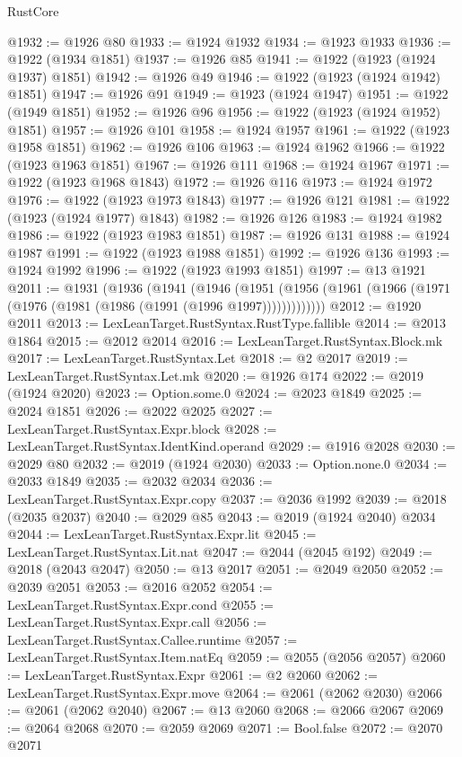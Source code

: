 \begin{lexlean}{RustCore}
\begin{coremodule}
@1932 := @1926 @80
@1933 := @1924 @1932
@1934 := @1923 @1933
@1936 := @1922 (@1934 @1851)
@1937 := @1926 @85
@1941 := @1922 (@1923 (@1924 @1937) @1851)
@1942 := @1926 @49
@1946 := @1922 (@1923 (@1924 @1942) @1851)
@1947 := @1926 @91
@1949 := @1923 (@1924 @1947)
@1951 := @1922 (@1949 @1851)
@1952 := @1926 @96
@1956 := @1922 (@1923 (@1924 @1952) @1851)
@1957 := @1926 @101
@1958 := @1924 @1957
@1961 := @1922 (@1923 @1958 @1851)
@1962 := @1926 @106
@1963 := @1924 @1962
@1966 := @1922 (@1923 @1963 @1851)
@1967 := @1926 @111
@1968 := @1924 @1967
@1971 := @1922 (@1923 @1968 @1843)
@1972 := @1926 @116
@1973 := @1924 @1972
@1976 := @1922 (@1923 @1973 @1843)
@1977 := @1926 @121
@1981 := @1922 (@1923 (@1924 @1977) @1843)
@1982 := @1926 @126
@1983 := @1924 @1982
@1986 := @1922 (@1923 @1983 @1851)
@1987 := @1926 @131
@1988 := @1924 @1987
@1991 := @1922 (@1923 @1988 @1851)
@1992 := @1926 @136
@1993 := @1924 @1992
@1996 := @1922 (@1923 @1993 @1851)
@1997 := @13 @1921
@2011 := @1931
    (@1936
      (@1941
        (@1946
          (@1951 (@1956 (@1961 (@1966 (@1971 (@1976 (@1981 (@1986 (@1991 (@1996 @1997)))))))))))))
@2012 := @1920 @2011
@2013 := LexLeanTarget.RustSyntax.RustType.fallible
@2014 := @2013 @1864
@2015 := @2012 @2014
@2016 := LexLeanTarget.RustSyntax.Block.mk
@2017 := LexLeanTarget.RustSyntax.Let
@2018 := @2 @2017
@2019 := LexLeanTarget.RustSyntax.Let.mk
@2020 := @1926 @174
@2022 := @2019 (@1924 @2020)
@2023 := Option.some.{0}
@2024 := @2023 @1849
@2025 := @2024 @1851
@2026 := @2022 @2025
@2027 := LexLeanTarget.RustSyntax.Expr.block
@2028 := LexLeanTarget.RustSyntax.IdentKind.operand
@2029 := @1916 @2028
@2030 := @2029 @80
@2032 := @2019 (@1924 @2030)
@2033 := Option.none.{0}
@2034 := @2033 @1849
@2035 := @2032 @2034
@2036 := LexLeanTarget.RustSyntax.Expr.copy
@2037 := @2036 @1992
@2039 := @2018 (@2035 @2037)
@2040 := @2029 @85
@2043 := @2019 (@1924 @2040) @2034
@2044 := LexLeanTarget.RustSyntax.Expr.lit
@2045 := LexLeanTarget.RustSyntax.Lit.nat
@2047 := @2044 (@2045 @192)
@2049 := @2018 (@2043 @2047)
@2050 := @13 @2017
@2051 := @2049 @2050
@2052 := @2039 @2051
@2053 := @2016 @2052
@2054 := LexLeanTarget.RustSyntax.Expr.cond
@2055 := LexLeanTarget.RustSyntax.Expr.call
@2056 := LexLeanTarget.RustSyntax.Callee.runtime
@2057 := LexLeanTarget.RustSyntax.Item.natEq
@2059 := @2055 (@2056 @2057)
@2060 := LexLeanTarget.RustSyntax.Expr
@2061 := @2 @2060
@2062 := LexLeanTarget.RustSyntax.Expr.move
@2064 := @2061 (@2062 @2030)
@2066 := @2061 (@2062 @2040)
@2067 := @13 @2060
@2068 := @2066 @2067
@2069 := @2064 @2068
@2070 := @2059 @2069
@2071 := Bool.false
@2072 := @2070 @2071

\end{coremodule}
\end{lexlean}
